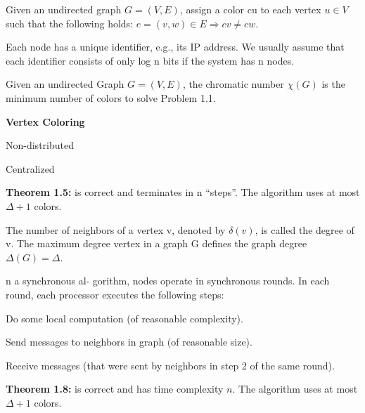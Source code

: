

{
	Given an undirected graph $G = (V, E)$, assign a color cu to each vertex $u \in
	V$ such that the following holds: $e = (v,w) \in E \Rightarrow cv \neq cw$.
} 

{
	Each node has a unique identifier, e.g., its IP address. We usually assume that
	each identifier consists of only log n bits if the system has n nodes.
}

{
	Given an undirected Graph $G = (V, E)$, the chromatic number $\chi (G)$ is the
	minimum number of colors to solve Problem 1.1. 
}

{
\begin{items}
	\item {\bf Vertex Coloring}
  \item Non-distributed
  \item Centralized
  \item {\bf Theorem 1.5:} is correct and terminates in n ``steps''. The
  algorithm uses at most $\Delta+1$ colors.
\end{items}
}

{
	The number of neighbors of a vertex v, denoted by $\delta (v)$, is called the
	degree of v. The maximum degree vertex in a graph G defines the graph degree
	$\Delta (G) = \Delta$.
}

{
	n a synchronous al- gorithm, nodes operate in synchronous rounds. In each
	round, each processor executes the following steps:
	\begin{enum}
	  \item Do some local computation (of reasonable complexity).
		\item Send messages to neighbors in graph (of reasonable size).
		\item Receive messages (that were sent by neighbors in step 2 of the same
		round).
	\end{enum} 
}

{
	\begin{items}
		\item {\bf Theorem 1.8:} is correct and has time complexity $n$. The algorithm uses
		at most $\Delta+1$ colors.
	\end{items}
}

